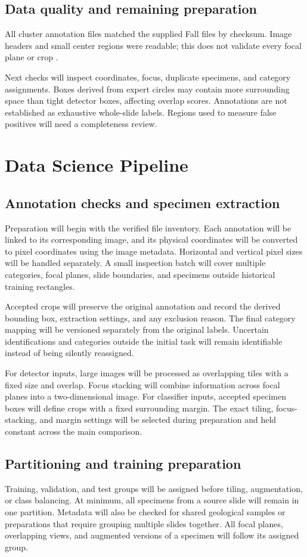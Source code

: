 \documentclass[11pt,letterpaper]{article}
\begin{document}
\subsection{Data quality and remaining preparation}
All \SlideCount{} cluster annotation files matched the supplied Fall files by checksum. Image headers and small center regions were readable; this does not validate every focal plane or crop \citep{inventory2026}.

Next checks will inspect coordinates, focus, duplicate specimens, and category assignments. Boxes derived from expert circles may contain more surrounding space than tight detector boxes, affecting overlap scores. Annotations are not established as exhaustive whole-slide labels. Regions used to measure false positives will need a completeness review.

\section{Data Science Pipeline}
\subsection{Annotation checks and specimen extraction}
Preparation will begin with the verified file inventory. Each annotation will be linked to its corresponding image, and its physical coordinates will be converted to pixel coordinates using the image metadata. Horizontal and vertical pixel sizes will be handled separately. A small inspection batch will cover multiple categories, focal planes, slide boundaries, and specimens outside historical training rectangles.

Accepted crops will preserve the original annotation and record the derived bounding box, extraction settings, and any exclusion reason. The final category mapping will be versioned separately from the original labels. Uncertain identifications and categories outside the initial task will remain identifiable instead of being silently reassigned.

For detector inputs, large images will be processed as overlapping tiles with a fixed size and overlap. Focus stacking will combine information across focal planes into a two-dimensional image. For classifier inputs, accepted specimen boxes will define crops with a fixed surrounding margin. The exact tiling, focus-stacking, and margin settings will be selected during preparation and held constant across the main comparison.

\subsection{Partitioning and training preparation}
Training, validation, and test groups will be assigned before tiling, augmentation, or class balancing. At minimum, all specimens from a source slide will remain in one partition. Metadata will also be checked for shared geological samples or preparations that require grouping multiple slides together. All focal planes, overlapping views, and augmented versions of a specimen will follow its assigned group.
\end{document}
